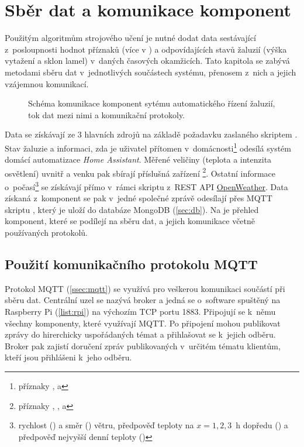 \chapter{Sběr dat a komunikace komponent} \label{chap:dataCollection}
  Použitým algoritmům strojového učení je nutné dodat data sestávající z~posloupnosti hodnot příznaků (více v ) a odpovídajících stavů žaluzií (výška vytažení a sklon lamel) v~daných časových okamžicích. Tato kapitola se zabývá metodami sběru dat v~jednotlivých součástech systému, přenosem z~nich a jejich vzájemnou komunikací.
  
  \begin{figure}[H]
    \centering
    
    \caption[Schéma komunikace komponent]{Schéma komunikace komponent sytému automatického řízení žaluzií, tok dat mezi nimi a komunikační protokoly.}
    \label{fig:comm}
  \end{figure}

  Data se získávají ze 3 hlavních zdrojů na základě požadavku zaslaného skriptem . Stav žaluzie a informaci, zda je uživatel přítomen v~domácnosti\footnote{příznaky ,  a } odesílá systém domácí automatizace \emph{Home Assistant}. Měřené veličiny (teplota a intenzita osvětlení) uvnitř a venku pak sbírají příslušná zařízení \footnote{příznaky , ,  a }. Ostatní informace o~počasí\footnote{rychlost () a směr () větru, předpověď teploty na $x=1,2,3$~h dopředu () a předpověď nejvyšší denní teploty ()} se získávají přímo v~rámci skriptu  z~REST API \href{https://openweathermap.org/}{OpenWeather}. Data získaná z~komponent se pak v~jedné společné zprávě odesílají přes MQTT skriptu , který je uloží do databáze MongoDB (\cref{sec:db}). Na  je přehled komponent, které se podílejí na sběru dat, a jejich komunikace včetně používaných protokolů.
  \section{Použití komunikačního protokolu MQTT} \label{sec:MQTT}
    Protokol MQTT (\cref{ssec:mqtt}) %
    se využívá pro veškerou komunikaci součástí při sběru dat. Centrální uzel se nazývá broker a jedná se o~software spuštěný na Raspberry Pi (\cref{list:rpi}) na výchozím TCP portu 1883. Připojují se k~němu všechny komponenty, které využívají MQTT. Po připojení mohou publikovat zprávy do hirerchicky uspořádaných témat a přihlašovat se k~jejich odběru. Broker pak zajistí doručení zpráv publikovaných v~určitém tématu klientům, kteří jsou přihlášeni k~jeho odběru.
    
